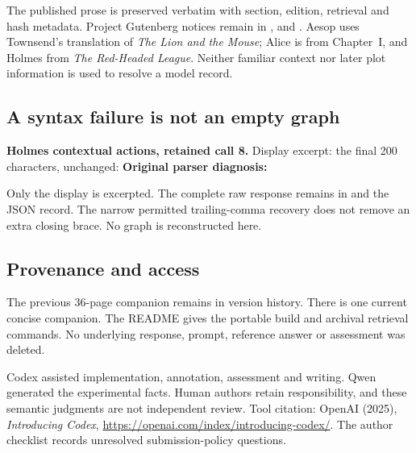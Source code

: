 The published prose is preserved verbatim with section, edition, retrieval and hash metadata. Project Gutenberg notices remain in ,  and . Aesop uses Townsend's translation of \emph{The Lion and the Mouse}; Alice is from Chapter~I, and Holmes from \emph{The Red-Headed League}. Neither familiar context nor later plot information is used to resolve a model record.

\subsection*{A syntax failure is not an empty graph}
\textbf{Holmes contextual actions, retained call 8.} Display excerpt: the final 200 characters, unchanged:
\textbf{Original parser diagnosis:} \HolmesParseError

Only the display is excerpted. The complete raw response remains in  and the JSON record. The narrow permitted trailing-comma recovery does not remove an extra closing brace. No graph is reconstructed here.

\subsection*{Provenance and access}
The previous 36-page companion remains in version history. There is one current concise companion. The README gives the portable build and archival retrieval commands. No underlying response, prompt, reference answer or assessment was deleted.

Codex assisted implementation, annotation, assessment and writing. Qwen generated the experimental facts. Human authors retain responsibility, and these semantic judgments are not independent review. Tool citation: OpenAI (2025), \emph{Introducing Codex}, \url{https://openai.com/index/introducing-codex/}. The author checklist records unresolved submission-policy questions.
